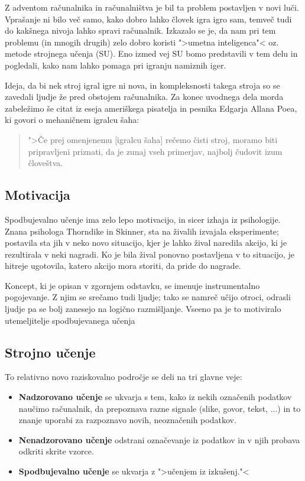 \documentclass[12pt,a4paper]{amsart}
\theoremstyle{definition} %
\theoremstyle{plain} %
\begin{document}
Z adventom računalnika in računalništva je bil ta problem postavljen v novi luči. Vprašanje
ni bilo več samo, kako dobro lahko človek igra igro sam, temveč tudi do kakšnega nivoja 
lahko spravi računalnik. Izkazalo se je, da nam pri tem problemu (in mnogih drugih) zelo dobro
koristi ">umetna inteligenca"< oz. metode strojnega učenja (SU). Eno izmed vej SU bomo 
predstavili v tem delu in pogledali, kako nam lahko pomaga pri igranju namiznih iger.

Ideja, da bi nek stroj igral igre ni nova, in kompleksnosti takega stroja so se zavedali ljudje
že pred obstojem računalnika. 
Za konec uvodnega dela morda zabeležimo še citat iz eseja ameriškega pisatelja in pesnika 
Edgarja Allana Poea, ki govori o mehaničnem igralcu šaha: 

\begin{quotation}
    ">Če prej omenjenemu [igralcu šaha] rečemo čisti stroj, moramo biti pripravljeni priznati, da je
    zunaj vseh primerjav, najbolj čudovit izum človeštva.
\end{quotation}

\subsection{Motivacija}
Spodbujevalno učenje ima zelo lepo motivacijo, in sicer izhaja iz psihologije. Znana psihologa 
Thorndike in Skinner, sta na živalih izvajala eksperimente; postavila sta jih v neko novo 
situacijo, kjer je lahko žival naredila akcijo, ki je rezultirala v neki nagradi. Ko je bila
žival ponovno postavljena v to situacijo, je hitreje ugotovila, katero akcijo mora storiti, da
pride do nagrade.

Koncept, ki je opisan v zgornjem odstavku, se imenuje instrumentalno pogojevanje. Z njim se 
srečamo tudi ljudje; tako se namreč učijo otroci, odrasli ljudje pa se bolj zanesejo na 
logično razmišljanje. Vseeno pa je to motiviralo utemeljitelje spodbujevanega učenja

\subsection{Strojno učenje}
To relativno novo raziskovalno področje se deli na tri glavne veje:
\begin{itemize}
    \item \textbf{Nadzorovano učenje} se ukvarja s tem, kako iz nekih označenih podatkov 
            naučimo računalnik, da prepoznava razne signale (slike, govor, tekst, ...)
            in to znanje uporabi za razpoznavo novih, neoznačenih podatkov.
    \item \textbf{Nenadzorovano učenje} odstrani označevanje iz podatkov in v njih probava 
            odkriti skrite vzorce.
    \item \textbf{Spodbujevalno učenje} se ukvarja z ">učenjem iz izkušenj."< 
\end{itemize}
\end{document}
